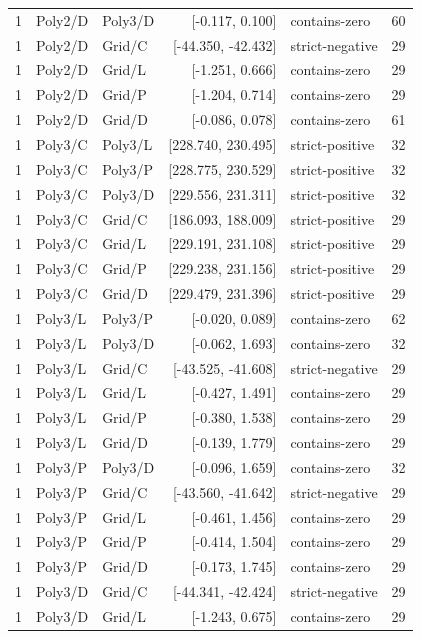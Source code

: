 \begin{longtable}{lllrlr}
1 & Poly2/D & Poly3/D & [-0.117, 0.100] & contains-zero & 60 \\
1 & Poly2/D & Grid/C & [-44.350, -42.432] & strict-negative & 29 \\
1 & Poly2/D & Grid/L & [-1.251, 0.666] & contains-zero & 29 \\
1 & Poly2/D & Grid/P & [-1.204, 0.714] & contains-zero & 29 \\
1 & Poly2/D & Grid/D & [-0.086, 0.078] & contains-zero & 61 \\
1 & Poly3/C & Poly3/L & [228.740, 230.495] & strict-positive & 32 \\
1 & Poly3/C & Poly3/P & [228.775, 230.529] & strict-positive & 32 \\
1 & Poly3/C & Poly3/D & [229.556, 231.311] & strict-positive & 32 \\
1 & Poly3/C & Grid/C & [186.093, 188.009] & strict-positive & 29 \\
1 & Poly3/C & Grid/L & [229.191, 231.108] & strict-positive & 29 \\
1 & Poly3/C & Grid/P & [229.238, 231.156] & strict-positive & 29 \\
1 & Poly3/C & Grid/D & [229.479, 231.396] & strict-positive & 29 \\
1 & Poly3/L & Poly3/P & [-0.020, 0.089] & contains-zero & 62 \\
1 & Poly3/L & Poly3/D & [-0.062, 1.693] & contains-zero & 32 \\
1 & Poly3/L & Grid/C & [-43.525, -41.608] & strict-negative & 29 \\
1 & Poly3/L & Grid/L & [-0.427, 1.491] & contains-zero & 29 \\
1 & Poly3/L & Grid/P & [-0.380, 1.538] & contains-zero & 29 \\
1 & Poly3/L & Grid/D & [-0.139, 1.779] & contains-zero & 29 \\
1 & Poly3/P & Poly3/D & [-0.096, 1.659] & contains-zero & 32 \\
1 & Poly3/P & Grid/C & [-43.560, -41.642] & strict-negative & 29 \\
1 & Poly3/P & Grid/L & [-0.461, 1.456] & contains-zero & 29 \\
1 & Poly3/P & Grid/P & [-0.414, 1.504] & contains-zero & 29 \\
1 & Poly3/P & Grid/D & [-0.173, 1.745] & contains-zero & 29 \\
1 & Poly3/D & Grid/C & [-44.341, -42.424] & strict-negative & 29 \\
1 & Poly3/D & Grid/L & [-1.243, 0.675] & contains-zero & 29 \\

\end{longtable}
